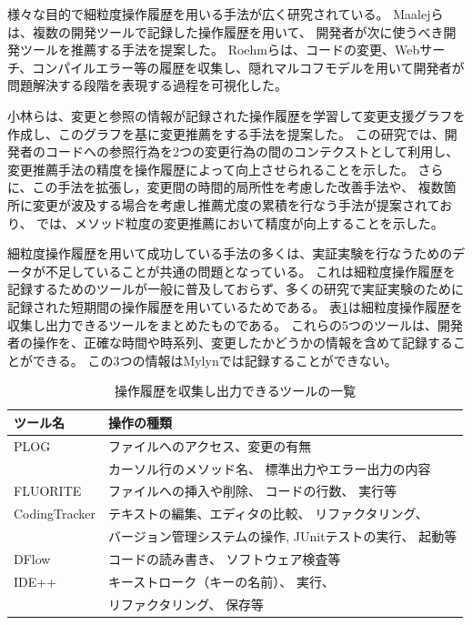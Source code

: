 \documentclass[a4paper]{jsbook}
\begin{document}
様々な目的で細粒度操作履歴を用いる手法が広く研究されている。
Maalejら\cite{Maalej:2010}は、複数の開発ツールで記録した操作履歴を用いて、
開発者が次に使うべき開発ツールを推薦する手法を提案した。
Roehmらは、コードの変更、Webサーチ、コンパイルエラー等の履歴を収集し、隠れマルコフモデルを用いて開発者が問題解決する段階を表現する過程を可視化した。

小林ら\cite{6233415,KatoJapanese:2011}は、変更と参照の情報が記録された操作履歴を学習して変更支援グラフを作成し、このグラフを基に変更推薦をする手法を提案した。
この研究では、開発者のコードへの参照行為を2つの変更行為の間のコンテクストとして利用し、変更推薦手法の精度を操作履歴によって向上させられることを示した。
さらに、この手法を拡張し，変更間の時間的局所性を考慮した改善手法\cite{ss2012-76}や、
複数箇所に変更が波及する場合を考慮し推薦尤度の累積を行なう手法\cite{ss2013-84,Yamamori:2016}が提案されており、
\cite{Yamamori:2016}では、メソッド粒度の変更推薦において精度が向上することを示した。

細粒度操作履歴を用いて成功している手法の多くは、実証実験を行なうためのデータが不足していることが共通の問題となっている。
これは細粒度操作履歴を記録するためのツールが一般に普及しておらず、多くの研究で実証実験のために記録された短期間の操作履歴を用いているためである。
表\ref{finegrained}は細粒度操作履歴を収集し出力できるツールをまとめたものである。
これらの5つのツールは、開発者の操作を、正確な時間や時系列、変更したかどうかの情報を含めて記録することができる。
この3つの情報はMylynでは記録することができない。

\begin{table}[bt]
  \caption{操作履歴を収集し出力できるツールの一覧}
  \centering
  \begin{tabular}{ll}
    \hline
    ツール名& 操作の種類\\
    \hline
    PLOG\cite{plog} & ファイルへのアクセス、変更の有無\\
           & カーソル行のメソッド名、 標準出力やエラー出力の内容 \\
    FLUORITE\cite{yoon:2011} & ファイルへの挿入や削除、
          コードの行数、 実行等  \\
    CodingTracker & 
    テキストの編集、エディタの比較、 リファクタリング、\\
    \cite{Negara:2012}\cite{Negara:2014}  & 
    バージョン管理システムの操作, 
    JUnitテストの実行、 起動等\\
    {\sc DFlow}\cite{minelli:2014} & コードの読み書き、 ソフトウェア検査等\\
    IDE++\cite{Gu:2014} & キーストローク（キーの名前）、 実行、 \\
                        & リファクタリング、 保存等\\
    \hline
  \end{tabular}
\label{finegrained}
\end{table}
\end{document}
